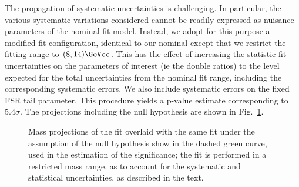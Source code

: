 The propagation of systematic uncertainties is challenging.  In
particular, the various systematic variations considered cannot be
readily expressed as nuisance parameters of the nominal fit model.
%
Instead, we adopt for this purpose a modified fit configuration,
identical to our nominal except that we restrict the fitting range to
$(8,14)\GeVcc$.  This has the effect of increasing the statistic fit
uncertainties on the parameters of interest (ie the double ratios) to
the level expected for the total uncertainties from the nominal fit
range, including the corresponding systematic errors.  We also include
systematic errors on the fixed FSR tail parameter.  This procedure
yields a p-value estimate corresponding to $5.4 \sigma$.  The projections
including the null hypothesis are shown in Fig.~\ref{fig:systSignifPlot}.

\begin{figure}
\begin{center}
\caption{Mass projections of the fit overlaid with the same fit under the assumption of the null hypothesis show in the dashed green curve, used in the estimation of the significance; the fit is performed in a restricted mass range, as to account for the systematic and statistical uncertainties, as described in the text.}
\label{fig:systSignifPlot}
\end{center}
\end{figure}


